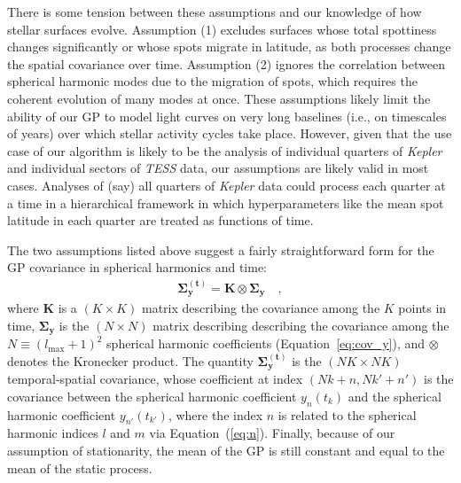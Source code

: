 \documentclass[modern]{aastex62}
\begin{document}
There is some tension between these assumptions and our knowledge of how stellar
surfaces evolve. Assumption (1) excludes surfaces whose total spottiness changes
significantly
or whose spots migrate in latitude, as both processes change the spatial covariance
over time. Assumption (2) ignores the correlation between spherical harmonic modes
due to the migration of spots, which requires the coherent evolution of many
modes at once. These assumptions likely limit the ability of our GP to model
light curves on very long baselines (i.e., on timescales of years) over which
stellar activity cycles take place. However, given that the use case of our
algorithm is likely to be the analysis of individual quarters of \emph{Kepler}
and individual sectors of \emph{TESS} data,
our assumptions are likely valid in most cases. Analyses of (say) all quarters of
\emph{Kepler} data could process each quarter at a time in a hierarchical
framework in which hyperparameters like the mean spot latitude in each quarter
are treated as functions of time.

The two assumptions listed above suggest a fairly straightforward form for the
GP covariance in spherical harmonics and time:
%
\begin{align}
    \label{eq:Sigmaty}
    \pmb{\Sigma}_\mathbf{y}^\mathbf{(t)} = \mathbf{K} \otimes \pmb{\Sigma}_\mathbf{y}
    \quad,
\end{align}
%
where $\mathbf{K}$ is a $(K \times K)$ matrix describing the
covariance among the $K$ points in time,
$\pmb{\Sigma}_\mathbf{y}$ is the $(N \times N)$ matrix describing describing
the covariance among the $N \equiv (l_\mathrm{max} + 1)^2$ spherical
harmonic coefficients (Equation~\ref{eq:cov_y}),
and $\otimes$ denotes the Kronecker product.
The quantity $\pmb{\Sigma}_\mathbf{y}^\mathbf{(t)}$
is the $(NK \times NK)$ temporal-spatial covariance, whose coefficient at index
$(Nk + n, Nk' + n')$ is the covariance between the spherical harmonic coefficient
$y_{n}(t_k)$ and the spherical harmonic coefficient $y_{n'}(t_{k'})$, where
the index $n$ is related to the spherical harmonic indices $l$ and $m$ via
Equation~(\ref{eq:n}). Finally, because of our assumption of stationarity,
the mean of the GP is still constant and equal to the mean of the static
process.
\end{document}
